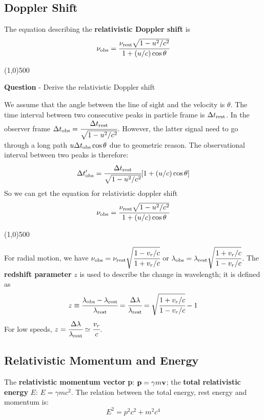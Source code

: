 \documentclass{article}
\numberwithin{equation}{section}
\numberwithin{figure}{section}
\newcommand{\hr}{\begin{center} \line(1,0){500} \end{center}}
\begin{document}
	\subsection{Doppler Shift}
	The equation describing the {\bf relativistic Doppler shift} is
	\begin{equation}
		\nu_{\rm obs} = \cfrac{\nu_{\rm rest}\sqrt{1-u^2/c^2}}{1+(u/c)\cos\theta}
	\end{equation}
	
	\hr{\bf Question} - Derive the relativistic Doppler shift
	
	We assume that the angle between the line of sight and the velocity is $\theta$. The time interval between two consecutive peaks in particle frame is $\Delta t_{\rm rest}$. In the observer frame $\Delta t_{\rm obs} = \cfrac{\Delta t_{\rm rest}}{\sqrt{1-u^2/c^2}}$. However, the latter signal need to go through a long path $u\Delta t_{\rm obs}\cos\theta$ due to geometric reason. The observational interval between two peaks is therefore:
	\begin{equation}
		\Delta t_{\rm obs}^\prime = \cfrac{\Delta t_{\rm rest}}{\sqrt{1-u^2/c^2}}[1+(u/c)\cos\theta]
	\end{equation}
	So we can get the equation for relativistic doppler shift
	\begin{equation}
		\nu_{\rm obs} = \cfrac{\nu_{\rm rest}\sqrt{1-u^2/c^2}}{1+(u/c)\cos\theta}
	\end{equation}
	\hr
	
	For radial motion, we have $\nu_{\rm obs} = \nu_{\rm rest}\sqrt{\cfrac{1-v_r/c}{1+v_r/c}}$ or $\lambda_{\rm obs} = \lambda_{\rm rest}\sqrt{\cfrac{1+v_r/c}{1-v_r/c}}$. The {\bf redshift parameter} $z$ is used to describe the change in wavelength; it is defined as
	\begin{equation}
		z \equiv \cfrac{\lambda_{\rm obs} - \lambda_{\rm rest}}{\lambda_{\rm rest}} = \cfrac{\Delta \lambda}{\lambda_{\rm rest}} = \sqrt{\cfrac{1+v_r/c}{1-v_r/c}} - 1
	\end{equation}
	For low speeds, $z = \cfrac{\Delta \lambda}{\lambda_{\rm rest}} \simeq \cfrac{v_r}{c}$.
	
	\subsection{Relativistic Momentum and Energy}
	The {\bf relativistic momentum vector} {\bf p}: ${\bf p} = \gamma m{\bf v}$; the {\bf total relativistic energy} $E$: $E=\gamma mc^2$.
	The relation between the total energy, rest energy and momentum is:
	\begin{equation}
		E^2 = p^2c^2 + m^2c^4
	\end{equation}
	
\end{document}
